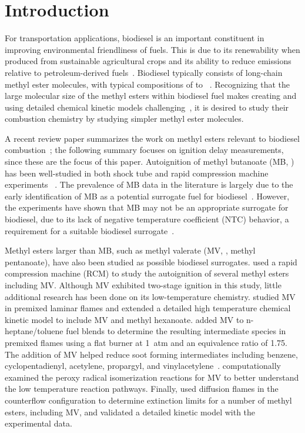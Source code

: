 \documentclass[letterpaper, review, sort&compress]{elsarticle}
\begin{document}

\linenumbers

\section{Introduction}\label{sec:introduction}

For transportation applications, biodiesel is an important constituent in improving environmental
friendliness of fuels. This is due to its renewability when produced from sustainable agricultural
crops and its ability to reduce emissions relative to petroleum-derived fuels~\cite{Hoekman2012}.
Biodiesel typically consists of long-chain methyl ester molecules, with typical compositions of
 to ~\cite{Hoekman2012}. Recognizing that the large molecular size of the methyl
esters within biodiesel fuel makes creating and using detailed chemical kinetic models
challenging~\cite{Lai2011}, it is desired to study their combustion chemistry by studying simpler
methyl ester molecules.

A recent review paper summarizes the work on methyl esters relevant to biodiesel
combustion~\cite{Coniglio2013}; the following summary focuses on ignition delay measurements, since
these are the focus of this paper. Autoignition of methyl butanoate (MB, ) has been
well-studied in both shock tube and rapid compression machine experiments~
\cite{Metcalfe2007,Walton2009,Dooley2008,Akih-Kumgeh2010,Akih-Kumgeh2011,Hadj-Ali2009,Kumar2016}.
The prevalence of MB data in the literature is largely due to the early identification of MB as a
potential surrogate fuel for biodiesel~\cite{Fisher2000}. However, the experiments have shown that
MB may not be an appropriate surrogate for biodiesel, due to its lack of negative temperature
coefficient (NTC) behavior, a requirement for a suitable biodiesel surrogate~\cite{Coniglio2013}.

Methyl esters larger than MB, such as methyl valerate (MV, , methyl pentanoate), have
also been studied as possible biodiesel surrogates. \citet{Hadj-Ali2009} used a rapid compression
machine (RCM) to study the autoignition of several methyl esters including MV. Although MV exhibited
two-stage ignition in this study, little additional research has been done on its low-temperature
chemistry. \citet{Korobeinichev2015} studied MV in premixed laminar flames and extended a detailed
high temperature chemical kinetic model to include MV and methyl hexanoate. \citet{Dmitriev2015}
added MV to n-heptane/toluene fuel blends to determine the resulting intermediate species in
premixed flames using a flat burner at \SI{1}{atm} and an equivalence ratio of 1.75. The addition of
MV helped reduce soot forming intermediates including benzene, cyclopentadienyl, acetylene,
propargyl, and vinylacetylene~\cite{Dmitriev2015}. \citet{Hayes2009} computationally examined the
peroxy radical isomerization reactions for MV to better understand the low temperature reaction
pathways. Finally, \citet{Dievart2013} used diffusion flames in the counterflow configuration to
determine extinction limits for a number of methyl esters, including MV, and validated a detailed
kinetic model with the experimental data.
\end{document}
